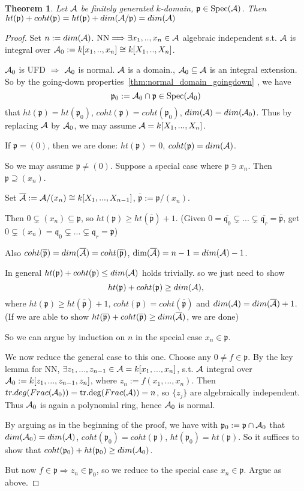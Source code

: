 \documentclass[11pt]{article}
\newtheorem{thm}{Theorem}[section]
\newcommand{\scp}{{\mathfrak p}}
\newcommand{\scq}{\mathfrak q}
\newcommand{\cala}{{\cal A}}
\newcommand{\Lrta}{\Longrightarrow}
\begin{document}
\begin{thm}\label{thm:finitelygeneratedk-domain_dim_equality}
Let $\cala$ be finitely generated $k$-domain, $\scp\in \text{Spec}(\cala)$. Then $ht(\scp)+coht(\scp)=ht(\scp)+dim(\cala/\scp)=dim(\cala)$
\end{thm}
\begin{proof}
Set $n:=dim(\cala)$. $\text{NN}\Lrta\exists x_1,..,x_n\in\cala$ algebraic independent s.t. $\cala$ is integral over $\cala_0:=k[x_1,..,x_n]\cong k[X_1,..,X_n]$.

$\cala_0$ is UFD $\Lrta$ $\cala_0$ is normal. $\cala$ is a domain., $\cala_0\subseteq \cala$ is an integral extension. So by the going-down properties~\ref{thm:normal_domain_goingdown} , we have 
$$
\scp_0:=\cala_0\cap\scp\in \text{Spec}(\cala_0)
$$
that 
$ht(\scp)=ht(\scp_0)$, $coht(\scp)=coht(\scp_0)$, 
$dim(\cala)=dim(\cala_0)$. Thus by replacing $\cala$ by $\cala_0$, we may assume $\cala=k[X_1,...,X_n]$.

If $\scp=(0)$, then we are done: $ht(\scp)=0$, $coht(\scp)=dim(\cala)$. 

So we may assume $\scp\neq (0)$.
Suppose a special case where $\scp\ni x_n$. Then $\scp\supseteq (x_n)$. 

Set $\overline{\cala}:=\cala/(x_n)\cong k[X_1,...,X_{n-1}]$, $\overline{\scp}:=\scp/(x_n)$.

Then $0\subsetneq (x_n)\subseteq \scp$, so $ht(\scp)\geq ht(\overline{\scp})+1$.
(Given $0=\overline{\scq_0}\subsetneq ...\subsetneq \overline{\scq_r}=\overline{\scp}$, get $0\subsetneq (x_n)=\scq_0\subsetneq...\subsetneq \scq_r=\scp $)

Also $coht(\overline{\scp})=dim(\overline{\cala})=coht(\overline{\scp})$, $\dim(\overline{\cala})=n-1=dim(\cala)-1$.

In general $ht(\scp)+coht(\scp)\leq dim(\cala)$ holds trivially. so we just need to show
 $$ht(\scp)+coht(\scp)\geq dim(\cala),$$
  where $ht(\scp)\geq ht(\overline{\scp})+1$, $coht(\scp)=coht(\overline{\scp})$ and $dim(\cala)=dim(\overline{\cala})+1$. (If we are able to show $ht(\overline{\scp})+coht(\overline{\scp})\geq dim(\overline{\cala})$, we are done)

So we can argue by induction on $n$ in the special case $x_n\in \scp$. 

We now reduce the general case to this one.
Choose any $0\neq f\in \scp$. By the key lemma for NN, $\exists z_1,...,z_{n-1}\in\cala=k[x_1,...,x_n]$, s.t. $\cala$ integral over $\cala_0:=k[z_1,...,z_{n-1},z_n]$, where $z_n:=f(x_1,...,x_n)$. Then $tr.deg (Frac(\cala_0))=\text{tr.deg}(Frac(\cala))=n$, so $\{z_j\}$ are algebraically independent. Thus $\cala_0$ is again a polynomial ring, hence $\cala_0$ is normal.

By arguing as in the beginning of the proof, we have with $\scp_0:=\scp\cap\cala_0$ that $dim(\cala_0)=dim(\cala)$, $coht(\scp_0)=coht(\scp)$, $ht(\scp_0)=ht(\scp)$. So it suffices to show that $coht(\scp_0)+ht(\scp_0)\geq dim(\cala_0)$. 

But now $f\in\scp\Lrta z_n\in\scp_0$, so we reduce to the special case $x_n\in\scp$. Argue as above. 
\end{proof}
\end{document}
